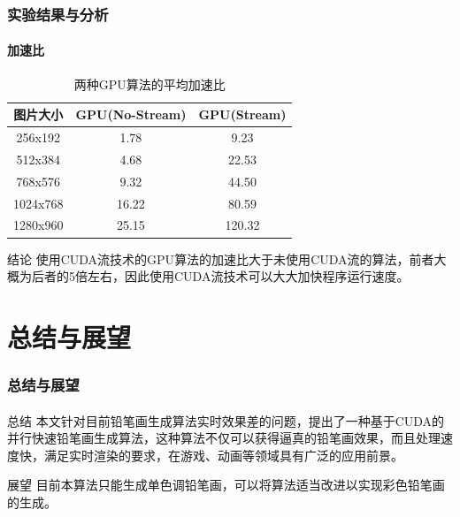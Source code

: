 \documentclass[aspectratio=43, xcolor=svgnames, t, 10pt]{beamer}
\begin{document}
\begin{frame}
  \frametitle{实验结果与分析}
  \framesubtitle{加速比}
  \begin{table}
    \centering
    \caption{两种GPU算法的平均加速比}
    \begin{tabular}{ccc}
      \toprule[1pt]
         图片大小 & \textrm{GPU(No-Stream)} & \textrm{GPU(Stream)}	\\
      \midrule
      256x192	&1.78&	9.23 \\
      512x384	&4.68&	22.53 \\
      768x576	&9.32&	44.50 \\
      1024x768 &	16.22&	80.59 \\
      1280x960	& 25.15&	120.32 \\
      \bottomrule[1pt]
    \end{tabular}
  \end{table}
  \begin{block}{结论}
    使用\textrm{CUDA}流技术的\textrm{GPU}算法的加速比大于未使用\textrm{CUDA}流的算法，前者大概为后者的5倍左右，因此使用\textrm{CUDA}流技术可以大大加快程序运行速度。
  \end{block}
\end{frame}

\section{总结与展望}
\begin{frame}
  \frametitle{总结与展望}
  \framesubtitle{}
  \begin{block}{总结}
    本文针对目前铅笔画生成算法实时效果差的问题，提出了一种基于CUDA的并行快速铅笔画生成算法，这种算法不仅可以获得逼真的铅笔画效果，而且处理速度快，满足实时渲染的要求，在游戏、动画等领域具有广泛的应用前景。
  \end{block}
  \begin{block}{展望}
    目前本算法只能生成单色调铅笔画，可以将算法适当改进以实现彩色铅笔画的生成。
  \end{block}
\end{frame}

{
\nwsuafwavesbg
  \begin{frame}
  \end{frame}
}
\end{document}
